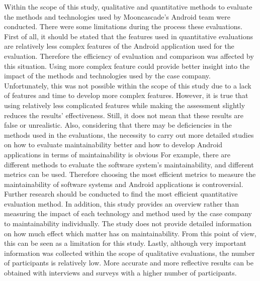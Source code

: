 Within the scope of this study, qualitative and quantitative methods to evaluate the methods and technologies used by Mooncascade's Android team were conducted. There were some limitations during the process these evaluations. 
First of all, it should be stated that the features used in quantitative evaluations are relatively less complex features of the Android application used for the evaluation. Therefore the efficiency of evaluation and comparison was affected by this situation. Using more complex feature could provide better insight into the impact of the methods and technologies used by the case company. Unfortunately, this was not possible within the scope of this study due to a lack of features and time to develop more complex features. However, it is true that using relatively less complicated features while making the assessment slightly reduces the results' effectiveness. Still, it does not mean that these results are false or unrealistic. Also, considering that there may be deficiencies in the methods used in the evaluations, the necessity to carry out more detailed studies on how to evaluate maintainability better and how to develop Android applications in terms of maintainability is obvious For example, there are different methods to evaluate the software system's maintainability, and different metrics can be used. Therefore choosing the most efficient metrics to measure the maintainability of software systems and Android applications is controversial. Further research should be conducted to find the most efficient quantitative evaluation method. In addition, this study provides an overview rather than measuring the impact of each technology and method used by the case company to maintainability individually. The study does not provide detailed information on how much effect which matter has on maintainability. From this point of view, this can be seen as a limitation for this study. Lastly, although very important information was collected within the scope of qualitative evaluations, the number of participants is relatively low. More accurate and more reflective results can be obtained with interviews and surveys with a higher number of participants.